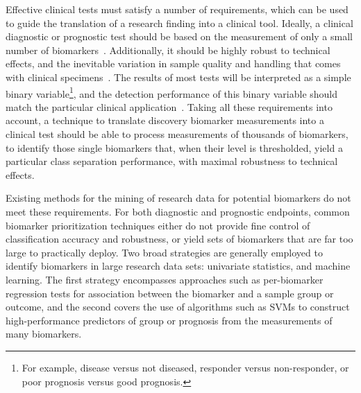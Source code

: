 \documentclass[dissertation.tex]{subfiles}
\begin{document}
Effective clinical tests must satisfy a number of requirements, which can be used to guide the translation of a research finding into a clinical tool.  Ideally, a clinical diagnostic or prognostic test should be based on the measurement of only a small number of biomarkers~\cite{Lesko2001, Pepe2001}.  Additionally, it should be highly robust to technical effects, and the inevitable variation in sample quality and handling that comes with clinical specimens~\cite{Hewitt2008}.  The results of most tests will be interpreted as a simple binary variable\footnote{For example, disease versus not diseased, responder versus non-responder, or poor prognosis versus good prognosis.}, and the detection performance of this binary variable should match the particular clinical application~\cite{Pepe2001}.  Taking all these requirements into account, a technique to translate discovery biomarker measurements into a clinical test should be able to process measurements of thousands of biomarkers, to identify those single biomarkers that, when their level is thresholded, yield a particular class separation performance, with maximal robustness to technical effects.

Existing methods for the mining of research data for potential biomarkers do not meet these requirements.  For both diagnostic and prognostic endpoints, common biomarker prioritization techniques either do not provide fine control of classification accuracy and robustness, or yield sets of biomarkers that are far too large to practically deploy.  Two broad strategies are generally employed to identify biomarkers in large research data sets: univariate statistics, and machine learning.  The first strategy encompasses approaches such as per-biomarker regression tests for association between the biomarker and a sample group or outcome, and the second covers the use of algorithms such as \glspl{SVM} to construct high-performance predictors of group or prognosis from the measurements of many biomarkers.
\end{document}
